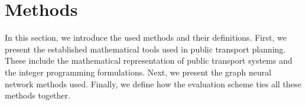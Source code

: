 \documentclass[english, 12pt, a4paper, sci, utf8, a-2b, online]{aaltothesis}
\newcommand{\draft}[1]{\textcolor{red}{\em (DRAFT) #1}}
\begin{document}

\clearpage
\section{Methods}

In this section, we introduce the used methods and their definitions. First, we present the established mathematical tools used in public transport planning. These include the mathematical representation of public transport systems and the integer programming formulations. Next, we present the graph neural network methods used. Finally, we define how the evaluation scheme ties all these methods together.
\end{document}
